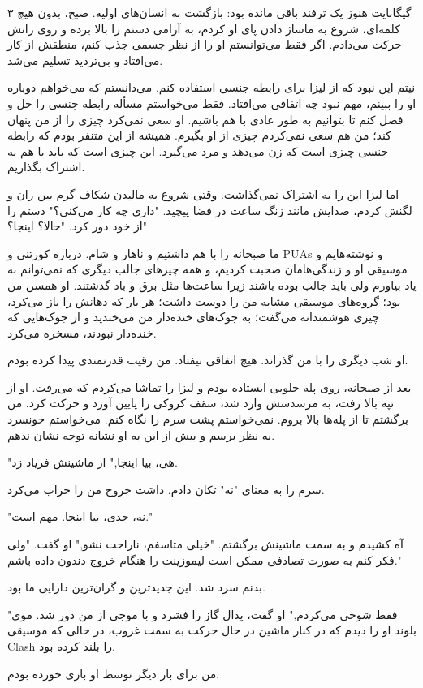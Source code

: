 ۳ گیگابایت  
هنوز یک ترفند باقی مانده بود: بازگشت به انسان‌های اولیه. صبح، بدون هیچ کلمه‌ای، شروع به ماساژ دادن پای او کردم، به آرامی دستم را بالا برده و روی رانش حرکت می‌دادم. اگر فقط می‌توانستم او را از نظر جسمی جذب کنم، منطقش از کار می‌افتاد و بی‌تردید تسلیم می‌شد.  

نیتم این نبود که از لیزا برای رابطه جنسی استفاده کنم. می‌دانستم که می‌خواهم دوباره او را ببینم، مهم نبود چه اتفاقی می‌افتاد. فقط می‌خواستم مسأله رابطه جنسی را حل و فصل کنم تا بتوانیم به طور عادی با هم باشیم. او سعی نمی‌کرد چیزی را از من پنهان کند؛ من هم سعی نمی‌کردم چیزی از او بگیرم. همیشه از این متنفر بودم که رابطه جنسی چیزی است که زن می‌دهد و مرد می‌گیرد. این چیزی است که باید با هم به اشتراک بگذاریم.  

اما لیزا این را به اشتراک نمی‌گذاشت. وقتی شروع به مالیدن شکاف گرم بین ران و لگنش کردم، صدایش مانند زنگ ساعت در فضا پیچید. "داری چه کار می‌کنی؟" دستم را از خود دور کرد. "حالا؟ اینجا؟"  

ما صبحانه را با هم داشتیم و ناهار و شام. درباره کورتنی و PUAs و نوشته‌هایم و موسیقی او و زندگی‌هامان صحبت کردیم، و همه چیزهای جالب دیگری که نمی‌توانم به یاد بیاورم ولی باید جالب بوده باشند زیرا ساعت‌ها مثل برق و باد گذشتند. او همسن من بود؛ گروه‌های موسیقی مشابه من را دوست داشت؛ هر بار که دهانش را باز می‌کرد، چیزی هوشمندانه می‌گفت؛ به جوک‌های خنده‌دار من می‌خندید و از جوک‌هایی که خنده‌دار نبودند، مسخره می‌کرد.  

او شب دیگری را با من گذراند. هیچ اتفاقی نیفتاد. من رقیب قدرتمندی پیدا کرده بودم.  

بعد از صبحانه، روی پله جلویی ایستاده بودم و لیزا را تماشا می‌کردم که می‌رفت. او از تپه بالا رفت، به مرسدسش وارد شد، سقف کروکی را پایین آورد و حرکت کرد. من برگشتم تا از پله‌ها بالا بروم. نمی‌خواستم پشت سرم را نگاه کنم. می‌خواستم خونسرد به نظر برسم و بیش از این به او نشانه توجه نشان ندهم.  

"هی، بیا اینجا," از ماشینش فریاد زد.  

سرم را به معنای "نه" تکان دادم. داشت خروج من را خراب می‌کرد.  

"نه، جدی، بیا اینجا. مهم است."  

آه کشیدم و به سمت ماشینش برگشتم. "خیلی متاسفم، ناراحت نشو," او گفت. "ولی فکر کنم به صورت تصادفی ممکن است لیموزینت را هنگام خروج دندون داده باشم."  

بدنم سرد شد. این جدیدترین و گران‌ترین دارایی ما بود.  

"فقط شوخی می‌کردم," او گفت، پدال گاز را فشرد و با موجی از من دور شد. موی بلوند او را دیدم که در کنار ماشین در حال حرکت به سمت غروب، در حالی که موسیقی Clash را بلند کرده بود.  

من برای بار دیگر توسط او بازی خورده بودم.